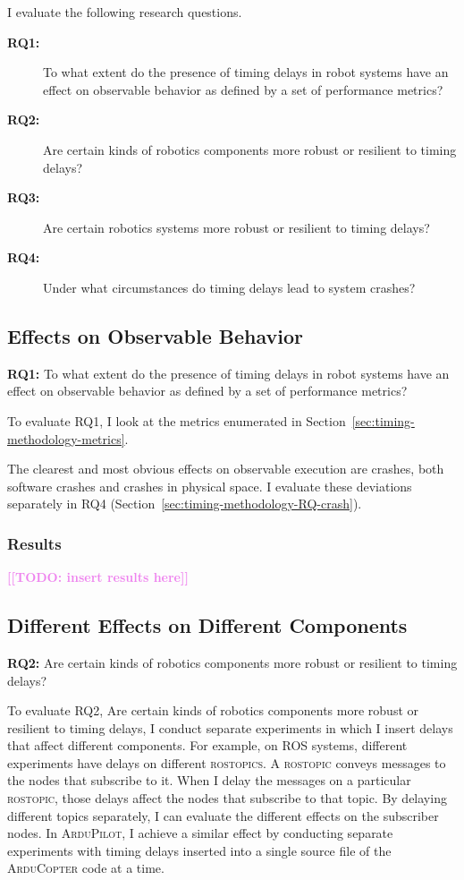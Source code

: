 \documentclass[conference]{IEEEtran}
\newcommand{\todo}[1]{\textcolor{violet}{{\bfseries [[TODO: #1]]}}}
\newcommand{\tool}[1]{\textsc{#1}}
\begin{document}
\label{sec:evaluation}
I evaluate the following research questions.
\begin{description}
\item[\textbf{RQ1:}] To what extent do the presence of timing delays in robot systems have an effect on observable behavior as defined by a set of performance metrics?
\item[\textbf{RQ2:}] Are certain kinds of robotics components more robust or resilient to timing delays?
\item[\textbf{RQ3:}]  Are certain robotics systems more robust or resilient to timing delays?
\item[\textbf{RQ4:}] Under what circumstances do timing delays lead to system crashes?
\end{description}

\subsection{Effects on Observable Behavior}
\label{sec:timing-methodology-RQ-observable}

\textbf{RQ1:} To what extent do the presence of timing delays in robot systems have an effect on observable behavior as defined by a set of performance metrics?

To evaluate RQ1, I look at the metrics enumerated in Section~\ref{sec:timing-methodology-metrics}.

The clearest and most obvious effects on observable execution are crashes, both software crashes and crashes in physical space.
I evaluate these deviations separately in RQ4 (Section~\ref{sec:timing-methodology-RQ-crash}).

\subsubsection{Results}
\todo{insert results here}

\subsection{Different Effects on Different Components}
\textbf{RQ2:} Are certain kinds of robotics components more robust or resilient to timing delays?

To evaluate RQ2, Are certain kinds of robotics components more robust or resilient to timing delays,
I conduct separate experiments in which I insert delays that affect different
components.
For example, on \tool{ROS} systems, different experiments have delays on different
\tool{rostopics}.
A \tool{rostopic} conveys messages to the nodes that subscribe to it.
When I delay the messages on a particular \tool{rostopic}, those delays affect the
nodes that subscribe to that topic.
By delaying different topics separately, I can evaluate the different effects on the subscriber nodes.
In \tool{ArduPilot}, I achieve a similar effect by conducting separate experiments with timing delays inserted into a single source file of the \tool{ArduCopter} code at a time.
\end{document}
